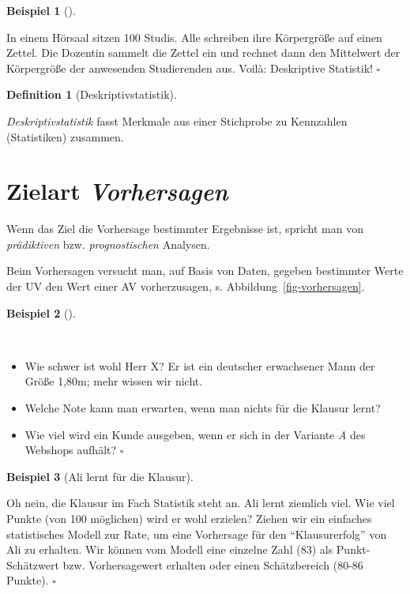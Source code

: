 \documentclass[
  ngerman,
  letterpaper,
  twoside,
  open=any]{scrbook}
\providecommand{\tightlist}{%
  \setlength{\itemsep}{0pt}\setlength{\parskip}{0pt}}\usepackage{longtable,booktabs,array}
\theoremstyle{definition}
\newtheorem{example}{Beispiel}[chapter]
\theoremstyle{plain}
\theoremstyle{definition}
\theoremstyle{definition}
\newtheorem{definition}{Definition}[chapter]
\theoremstyle{remark}
\begin{document}
\begin{example}[]\protect\hypertarget{exm-desk}{}\label{exm-desk}

In einem Hörsaal sitzen 100 Studis. Alle schreiben ihre Körpergröße auf
einen Zettel. Die Dozentin sammelt die Zettel ein und rechnet dann den
Mittelwert der Körpergröße der anwesenden Studierenden aus. Voilà:
Deskriptive Statistik! \(\square\)

\end{example}

\begin{definition}[Deskriptivstatistik]\protect\hypertarget{def-desk}{}\label{def-desk}

\emph{Deskriptivstatistik} fasst Merkmale aus einer Stichprobe zu
Kennzahlen (Statistiken) zusammen.

\end{definition}

\section{\texorpdfstring{Zielart
\emph{Vorhersagen}}{Zielart Vorhersagen}}\label{zielart-vorhersagen}

Wenn das Ziel die Vorhersage bestimmter Ergebnisse ist, spricht man von
\emph{prädiktiven} bzw. \emph{prognostischen} Analysen.

Beim Vorhersagen versucht man, auf Basis von Daten, gegeben bestimmter
Werte der UV den Wert einer AV vorherzusagen, s.
Abbildung~\ref{fig-vorhersagen}.

\begin{example}[]\protect\hypertarget{exm-ziel-vorhersagen}{}\label{exm-ziel-vorhersagen}

~

\begin{itemize}
\tightlist
\item
  Wie schwer ist wohl Herr X? Er ist ein deutscher erwachsener Mann der
  Größe 1,80m; mehr wissen wir nicht.
\item
  Welche Note kann man erwarten, wenn man nichts für die Klausur lernt?
\item
  Wie viel wird ein Kunde ausgeben, wenn er sich in der Variante
  \emph{A} des Webshops aufhält? \(\square\)
\end{itemize}

\end{example}

\begin{example}[Ali lernt für die
Klausur]\protect\hypertarget{exm-ali-lernt}{}\label{exm-ali-lernt}

Oh nein, die Klausur im Fach Statistik steht an. Ali lernt ziemlich
viel. Wie viel Punkte (von 100 möglichen) wird er wohl erzielen? Ziehen
wir ein einfaches statistisches Modell zur Rate, um eine Vorhersage für
den \enquote{Klausurerfolg} von Ali zu erhalten. Wir können vom Modell
eine einzelne Zahl (83) als Punkt-Schätzwert bzw. Vorhersagewert
erhalten oder einen Schätzbereich (80-86 Punkte). \(\square\)

\end{example}
\end{document}
